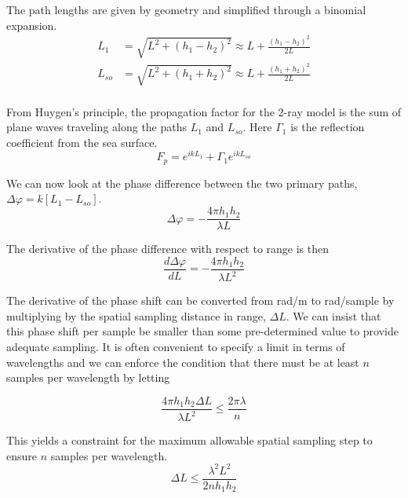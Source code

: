 The path lengths are given by geometry and simplified through a binomial expansion.
\begin{equation}
\begin{aligned}
L_1 & = \sqrt{L^2 + (h_1-h_2)^2}  \approx L + \frac{(h_1 - h_2)^2}{2L}\\
L_{so} & = \sqrt{L^2 + (h_1+h_2)^2}  \approx L + \frac{(h_1 + h_2)^2}{2L}\\
\end{aligned}
\label{mp_eq:1}
\end{equation}
\renewcommand{\baselinestretch}{2} \small\normalsize

From Huygen's principle, the propagation factor for the 2-ray model is the sum of plane waves traveling along the paths $L_1$ and $L_{so}$. Here $\Gamma_1$ is the reflection coefficient from the sea surface.
\begin{equation}
\boxed{F_p = e^{ikL_1} + \Gamma_1e^{ikL_{so}}}
\label{mp_eq:1b}
\end{equation}

We can now look at the phase difference between the two primary paths, $\Delta\varphi = k\left[ L_1 - L_{so}\right]$.
\begin{equation}
\boxed{\Delta\varphi = -\frac{4\pi h_1h_2}{\lambda L}}
\label{mp_eq:7}
\end{equation}
\renewcommand{\baselinestretch}{2} \small\normalsize

The derivative of the phase difference with respect to range is then
\begin{equation}
\frac{d\Delta\varphi}{dL}=-\frac{4\pi h_1h_2}{\lambda L^2}
\label{mp_eq:8}
\end{equation}

The derivative of the phase shift can be converted from rad/m to rad/sample by multiplying by the spatial sampling distance in range, $\Delta L$. We can insist that this phase shift per sample be smaller than some pre-determined value to provide adequate sampling. It is often convenient to specify a limit in terms of wavelengths and we can enforce the condition that there must be at least $n$ samples per wavelength by letting

\begin{equation}
\frac{4\pi h_1h_2\Delta L}{\lambda L^2} \leq \frac{2\pi \lambda}{n}
\label{mp_eq:10}
\end{equation}

This yields a constraint for the maximum allowable spatial sampling step to ensure $n$ samples per wavelength.
\begin{equation}
\boxed{\Delta L \leq \frac{\lambda^2 L^2}{2nh_1h_2}}
\label{mp_eq:11}
\end{equation}

